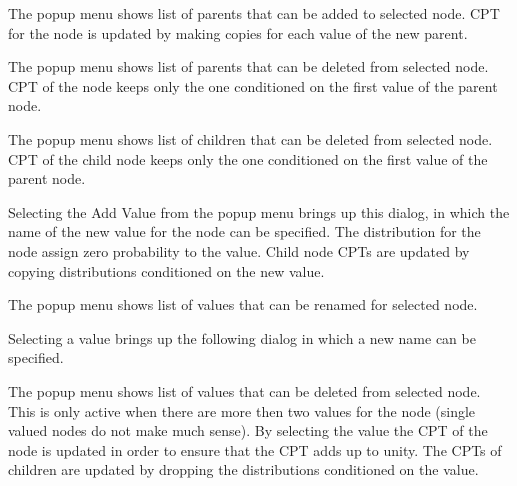 \documentclass[a4paper]{article}
\begin{document}
The popup menu shows list of parents that can be added to selected node.
CPT for the node is updated by making copies for each value of the new parent.
\begin{center}
\end{center}

The popup menu shows list of parents that can be deleted from selected node.
CPT of the node keeps only the one conditioned on the first value of the
parent node.
\begin{center}
\end{center}

The popup menu shows list of children that can be deleted from selected node.
CPT of the child node keeps only the one conditioned on the first value 
of the parent node.
\begin{center}
\end{center}


Selecting the Add Value from the popup menu brings up this dialog,
in which the name of the new value for the node can be specified.
The distribution for the node assign zero probability to the value.
Child node CPTs are updated by copying distributions conditioned on
the new value.
\begin{center}
\end{center}

The popup menu shows list of values that can be renamed for selected node.
\begin{center}
\end{center}

Selecting a value brings up the following dialog in which a new name
can be specified.
\begin{center}
\end{center}

The popup menu shows list of values that can be deleted from selected node.
This is only active when there are more then two values for the node (single
valued nodes do not make much sense).
By selecting the value the CPT of the node is updated in order to ensure
that the CPT adds up to unity. The CPTs of children are updated by dropping
the distributions conditioned on the value.
\begin{center}
\end{center}
\end{document}
